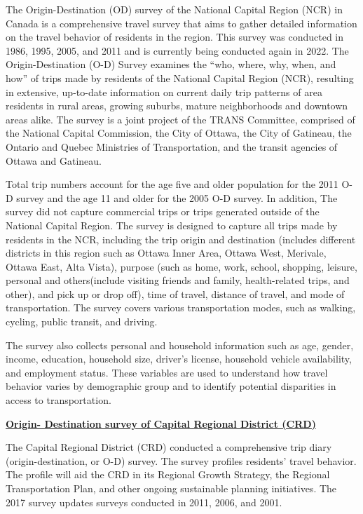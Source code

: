 \documentclass[
11pt, %
oneside, %
english, %
singlespacing, %
]{macthesis} %
\begin{document}
The Origin-Destination (OD) survey of the National Capital Region (NCR) in Canada is a comprehensive travel survey that aims to gather detailed information on the travel behavior of residents in the region. This survey was conducted in 1986, 1995, 2005, and 2011 and is currently being conducted again in 2022. The Origin-Destination (O-D) Survey examines the ``who, where, why, when, and how'' of trips made by residents of the National Capital Region (NCR), resulting in extensive, up-to-date information on current daily trip patterns of area residents in rural areas, growing suburbs, mature neighborhoods and downtown areas alike. The survey is a joint project of the TRANS Committee, comprised of the National Capital Commission, the City of Ottawa, the City of Gatineau, the Ontario and Quebec Ministries of Transportation, and the transit agencies of Ottawa and Gatineau.

Total trip numbers account for the age five and older population for the 2011 O-D survey and the age 11 and older for the 2005 O-D survey. In addition, The survey did not capture commercial trips or trips generated outside of the National Capital Region. The survey is designed to capture all trips made by residents in the NCR, including the trip origin and destination (includes different districts in this region such as Ottawa Inner Area, Ottawa West, Merivale, Ottawa East, Alta Vista), purpose (such as home, work, school, shopping, leisure, personal and others(include visiting friends and family, health-related trips, and other), and pick up or drop off), time of travel, distance of travel, and mode of transportation. The survey covers various transportation modes, such as walking, cycling, public transit, and driving.

The survey also collects personal and household information such as age, gender, income, education, household size, driver's license, household vehicle availability, and employment status. These variables are used to understand how travel behavior varies by demographic group and to identify potential disparities in access to transportation.

\textbf{\href{https://www.crd.bc.ca/project/regional-transportation/origin-destination-household-travel}{Origin- Destination survey of Capital Regional District (CRD)}}

The Capital Regional District (CRD) conducted a comprehensive trip diary (origin-destination, or O-D) survey. The survey profiles residents' travel behavior. The profile will aid the CRD in its Regional Growth Strategy, the Regional Transportation Plan, and other ongoing sustainable planning initiatives. The 2017 survey updates surveys conducted in 2011, 2006, and 2001.
\end{document}
